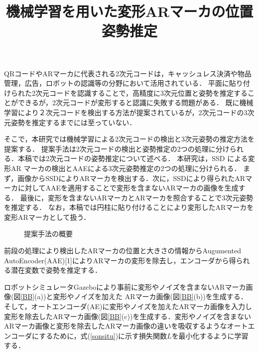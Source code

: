 \documentclass{jsarticle}
\title{機械学習を用いた変形ARマーカの位置姿勢推定}
\begin{document}
\maketitle

QRコードやARマーカに代表される2次元コードは，キャッシュレス決済や物品管理，広告，ロボットの認識等の分野において活用されている．
平面に貼り付けられた2次元コードを認識することで，高精度に3次元位置と姿勢を推定することができるが，2次元コードが変形すると認識に失敗する問題がある．
既に機械学習により２次元コードを検出する方法が提案されているが，2次元コードの3次元姿勢を推定するまでには至っていない．

そこで，本研究では機械学習による2次元コードの検出と3次元姿勢の推定方法を提案する．
提案手法は2次元コードの検出と姿勢推定の2つの処理に分けられる．本稿では2次元コードの姿勢推定について述べる．
本研究は，SSD による変形AR マーカの検出とAAEによる3次元姿勢推定の2つの処理に分けられる．
まず，画像からSSDによりARマーカを検出する．次に，SSDにより得られたARマーカに対してAAEを適用することで変形を含まないARマーカの画像を生成する．
最後に，変形を含まないARマーカとARマーカを照合することで3次元姿勢を推定する．
なお，本稿では円柱に貼り付けることにより変形したARマーカを変形ARマーカとして扱う．

\begin{figure}[ht]
\vspace{-1zh}
\setlength{\epsfxsize}{7cm}
\centerline{}
\vspace{-2zh}
\caption{提案手法の概要}
\label{flow}
\vspace{-2zh}
\end{figure}

前段の処理により検出したARマーカの位置と大きさの情報からAugumented AutoEncoder(AAE)[1]によりARマーカの変形を除去し，エンコーダから得られる潜在変数で姿勢を推定する．

ロボットシミュレータGazeboにより事前に変形やノイズを含まないARマーカ画像(図\ref{BB}(a))と変形やノイズを加えた
ARマーカ画像(図\ref{BB}(b))を生成する．
そして，オートエンコーダ(AE)に変形やノイズを加えたARマーカ画像を入力し変形を除去したARマーカ画像(図\ref{BB}(c))を生成する．変形やノイズを含まないARマーカ画像と変形を除去したARマーカ画像の違いを吸収するようなオートエンコーダにするために，式(\ref{sonsitu})に示す損失関数$L$を最小化するように学習する．
\end{document}
